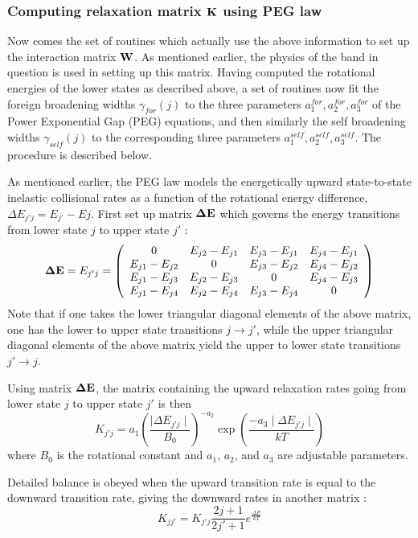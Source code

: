 \documentclass[11pt]{article}
\begin{document}
\subsubsection{Computing relaxation matrix ${\bf K}$  using PEG law}
Now comes the set of routines which actually use the above information to 
set up the interaction matrix ${\bf W}$. As mentioned earlier, the physics
of the band in question is used in setting up this matrix. Having computed
the rotational energies of the lower states as described above, a set of 
routines now fit the foreign broadening widths $\gamma_{for}(j)$ to the 
three parameters $a_{1}^{for},a_{2}^{for},a_{3}^{for}$ of the Power 
Exponential Gap (PEG) equations, and then similarly the self broadening 
widths $\gamma_{self}(j)$ to the corresponding three  parameters 
$a_{1}^{self},a_{2}^{self},a_{3}^{self}$. The procedure is described below.

As mentioned earlier, the PEG law models the energetically upward 
state-to-state inelastic collisional rates as a function of the rotational 
energy difference, $\Delta E_{j'j} = E_{j'} - E{j}$.  First set up matrix 
${\bf \Delta E}$ which governs the energy transitions from lower state 
$j$ to upper state $j'$ :
\[
{\bf \Delta E} = {E_{j'j}} = 
\left(
\begin{array}{cccc} 
         0    & E_{j2}-E_{j1} & E_{j3}-E_{j1} & E_{j4}-E_{j1} \\
E_{j1}-E_{j2} & 0             & E_{j3}-E_{j2} & E_{j4}-E_{j2} \\
E_{j1}-E_{j3} &E_{j2}-E_{j3}  & 0             & E_{j4}-E_{j3} \\
E_{j1}-E_{j4} &E_{j2}-E_{j4}  & E_{j3}-E_{j4} & 0 
\end{array}\\
\right)
\]
Note that if one takes the lower triangular diagonal elements of the above
matrix, one has the lower to upper state transitions $j \rightarrow j'$, 
while the upper triangular diagonal elements of the above
matrix yield the upper to lower state transitions $j' \rightarrow j$. 

Using matrix ${\bf \Delta E}$, the matrix containing the upward relaxation 
rates going from lower state $j$ to upper state $j'$ is then
\[
 K_{j'j}=a_{1}\left(\frac{\mid\Delta E_{j'j}\mid}{B_{0}}\right)^{-a_{2}}
\exp\left(\frac{-a_{3}\mid\Delta E_{j'j}\mid}{kT}\right)
\]
where $B_{0}$ is the rotational constant and $a_{1}$, $a_{2}$, and $a_{3}$
are adjustable parameters. 

Detailed balance is obeyed when the upward transition rate is equal to the
downward transition rate, giving the downward rates in another matrix :
\[
K_{jj'}=K_{j'j} \frac{2j+1}{2j'+1} e^{\frac{\Delta E}{kT}}
\]
\end{document}
